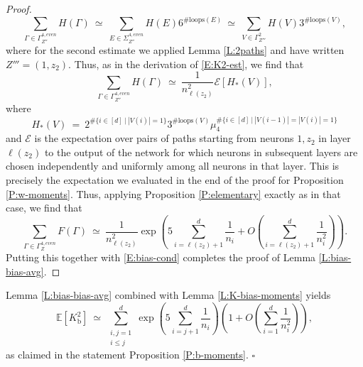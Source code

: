 \documentclass[11pt, reqno]{amsart}
\newcommand{\E}[1]{{\mathbb E}\left [#1\right]}
\newcommand{\cs}{$\clubsuit$}
\newcommand{\abs}[1]{\ensuremath{\left| #1 \right|}}
\newcommand{\lr}[1]{\ensuremath{\left(#1 \right)}}
\newcommand{\set}[1]{\ensuremath{\{#1\}}}
\newcommand{\Kb}{K_{\mathrm{b}}}
\newcommand{\Dbb}{\Delta_{\mathrm{bb}}}
\begin{document}
\begin{proof}
\[\sum_{\Gamma\in \Gamma_{Z''}^{4,even}} H(\Gamma)~\simeq~\sum_{E\in \Sigma_{Z''}^{4,even}} H(E)6^{\#\text{loops}(E)}~\simeq~\sum_{V\in \Gamma_{Z'''}^{2}} H(V)3^{\#\text{loops}(V)},\]
where for the second estimate we applied Lemma \ref{L:2paths} and have written $Z''' = (1,z_2)$. Thus, as in the derivation of \eqref{E:K2-est}, we find that 
\[\sum_{\Gamma\in \Gamma_{Z''}^{4,even}} H(\Gamma)~\simeq~\frac{1}{n_{\ell(z_2)}^2} \mathcal E\left[H_*(V)\right],\]
where
\[H_*(V)~=~2^{\#\set{i\in [d]~|~\abs{V(i)}=1}}3^{\#\text{loops}(V)}\mu_4^{\#\set{i\in [d]~|~\abs{V(i-1)}=\abs{V(i)}=1}}\]
and $\mathcal E$ is the expectation over pairs of paths starting from neurons $1, z_2$ in layer $\ell(z_2)$ to the output of the network for which neurons in subsequent layers are chosen independently and uniformly among all neurons in that layer. This is precisely the expectation we evaluated in the end of the proof for Proposition \ref{P:w-moments}. Thus, applying Proposition \ref{P:elementary} exactly as in that case, we find that
\[\sum_{\Gamma\in \Gamma_{Z}^{4,even}} F(\Gamma)~\simeq~ \frac{1}{n_{\ell(z_2)}^2}\exp\lr{5\sum_{i=\ell(z_2)+1}^d \frac{1}{n_i}+O\lr{\sum_{i=\ell(z_2)+1}^d\frac{1}{n_i^2}}}.\]
Putting this together with \eqref{E:bias-cond} completes the proof of Lemma \ref{L:bias-bias-avg}. 
\end{proof}
\noindent Lemma \ref{L:bias-bias-avg} combined with Lemma \ref{L:K-bias-moments} yields 
\[\E{\Kb^2}~\simeq~\sum_{\substack{i,j=1\\i\leq j}}^d \exp\lr{5\sum_{i=j+1}^d \frac{1}{n_i}}\lr{1+O\lr{\sum_{i=1}^d\frac{1}{n_i^2}}},\]
as claimed in the statement Proposition \ref{P:b-moments}. \hfill $\square$

\end{document}
